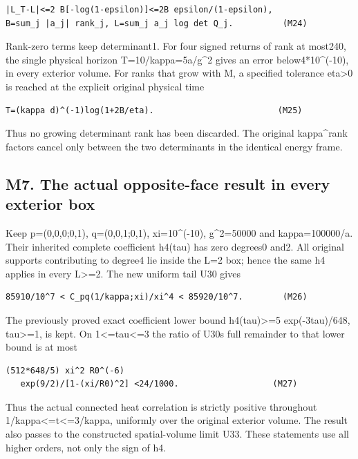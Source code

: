 \documentclass[11pt,a4paper]{article}
\renewcommand{\[}{\begingroup\small\originaldisplaystart}
\renewcommand{\]}{\originaldisplayend\endgroup}
\begin{document}
\begin{verbatim}
|L_T-L|<=2 B[-log(1-epsilon)]<=2B epsilon/(1-epsilon),
B=sum_j |a_j| rank_j, L=sum_j a_j log det Q_j.          (M24)
\end{verbatim}

Rank-zero terms keep determinant1. For four signed returns of rank at
most240, the single physical horizon T=10/kappa=5a/g\^{}2 gives an error
below4*10\^{}(-10), in every exterior volume. For ranks that grow with
M, a specified tolerance eta\textgreater0 is reached at the explicit
original physical time

\begin{verbatim}
T=(kappa d)^(-1)log(1+2B/eta).                         (M25)
\end{verbatim}

Thus no growing determinant rank has been discarded. The original
kappa\^{}rank factors cancel only between the two determinants in the
identical energy frame.

\subsection{M7. The actual opposite-face result in every exterior
box}\label{m7.-the-actual-opposite-face-result-in-every-exterior-box}

Keep p=(0,0,0;0,1), q=(0,0,1;0,1), xi=10\^{}(-10), g\^{}2=50000 and
kappa=100000/a. Their inherited complete coefficient h4(tau) has zero
degrees0 and2. All original supports contributing to degree4 lie inside
the L=2 box; hence the same h4 applies in every L\textgreater=2. The new
uniform tail U30 gives

\begin{verbatim}
85910/10^7 < C_pq(1/kappa;xi)/xi^4 < 85920/10^7.        (M26)
\end{verbatim}

The previously proved exact coefficient lower bound
h4(tau)\textgreater=5 exp(-3tau)/648, tau\textgreater=1, is kept. On
1\textless=tau\textless=3 the ratio of U30\textquotesingle s full
remainder to that lower bound is at most

\begin{verbatim}
(512*648/5) xi^2 R0^(-6)
   exp(9/2)/[1-(xi/R0)^2] <24/1000.                   (M27)
\end{verbatim}

Thus the actual connected heat correlation is strictly positive
throughout
{1\allowbreak{}/\allowbreak{}k\allowbreak{}a\allowbreak{}p\allowbreak{}p\allowbreak{}a\allowbreak{}\textless{}\allowbreak{}=\allowbreak{}t\allowbreak{}\textless{}\allowbreak{}=\allowbreak{}3\allowbreak{}/\allowbreak{}k\allowbreak{}a\allowbreak{}p\allowbreak{}p\allowbreak{}a\allowbreak{},\allowbreak{}}
uniformly over the original exterior volume. The result also passes to
the constructed spatial-volume limit U33. These statements use all
higher orders, not only the sign of h4.
\end{document}
